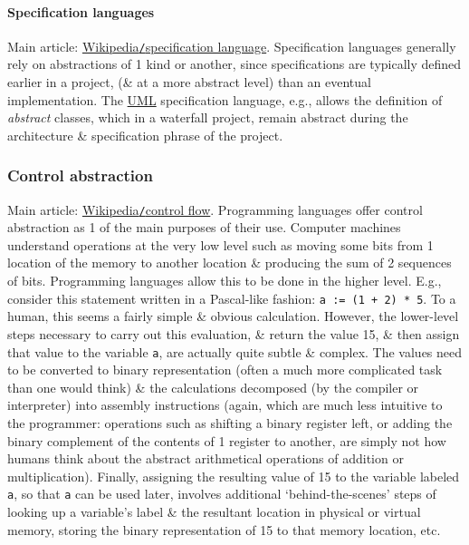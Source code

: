 \documentclass{article}
\begin{document}
\paragraph{Specification languages}
Main article: \href{https://en.wikipedia.org/wiki/Specification_language}{Wikipedia{\tt/}specification language}. Specification languages generally rely on abstractions of 1 kind or another, since specifications are typically defined earlier in a project, (\& at a more abstract level) than an eventual implementation. The \href{https://en.wikipedia.org/wiki/Unified_Modeling_Language}{UML} specification language, e.g., allows the definition of {\it abstract} classes, which in a waterfall project, remain abstract during the architecture \& specification phrase of the project.

\subsubsection{Control abstraction}
Main article: \href{https://en.wikipedia.org/wiki/Control_flow}{Wikipedia{\tt/}control flow}. Programming languages offer control abstraction as 1 of the main purposes of their use. Computer machines understand operations at the very low level such as moving some bits from 1 location of the memory to another location \& producing the sum of 2 sequences of bits. Programming languages allow this to be done in the higher level. E.g., consider this statement written in a Pascal-like fashion: \verb|a := (1 + 2) * 5|. To a human, this seems a fairly simple \& obvious calculation. However, the lower-level steps necessary to carry out this evaluation, \& return the value 15, \& then assign that value to the variable {\tt a}, are actually quite subtle \& complex. The values need to be converted to binary representation (often a much more complicated task than one would think) \& the calculations decomposed (by the compiler or interpreter) into assembly instructions (again, which are much less intuitive to the programmer: operations such as shifting a binary register left, or adding the binary complement of the contents of 1 register to another, are simply not how humans think about the abstract arithmetical operations of addition or multiplication). Finally, assigning the resulting value of 15 to the variable labeled {\tt a}, so that {\tt a} can be used later, involves additional `behind-the-scenes' steps of looking up a variable's label \& the resultant location in physical or virtual memory, storing the binary representation of 15 to that memory location, etc.
\end{document}

